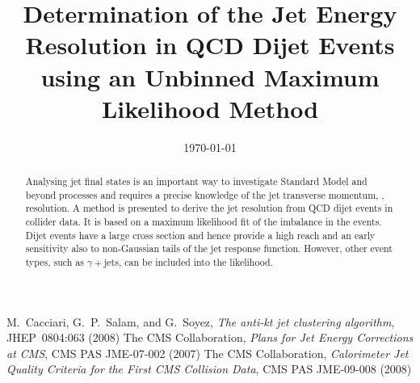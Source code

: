 \documentclass[a4paper]{cmspaper} %
\begin{document}
\begin{titlepage}
  \date{\today}
  \title{Determination of the Jet Energy Resolution in QCD Dijet
    Events using an Unbinned Maximum Likelihood Method}
  \begin{abstract}
    Analysing jet final states is an important way to investigate Standard Model and beyond processes and requires a precise knowledge of the jet transverse momentum, \pt, resolution.	
    A method is presented to derive the jet \pt resolution from QCD dijet events in collider data.
    It is based on a maximum likelihood fit of the \pt imbalance in the events.	
    Dijet events have a large cross section and hence provide a high \pt reach and an early sensitivity also to non-Gaussian tails of the jet response function.
    However, other event types, such as $\gamma+$jets, can be included into the likelihood.	
  \end{abstract}
\end{titlepage}
\tableofcontents












\begin{thebibliography}{9}
 M.~Cacciari, G.~P.~Salam, and G.~Soyez,
  \textit{The anti-kt jet clustering algorithm},
  JHEP~0804:063 (2008)
 The CMS Collaboration,
  \textit{Plans for Jet Energy Corrections at CMS},
  CMS PAS JME-07-002 (2007)
  The CMS Collaboration,
  \textit{Calorimeter Jet Quality Criteria for the First CMS Collision Data},
  CMS PAS JME-09-008 (2008)
\end{thebibliography}
\end{document}
